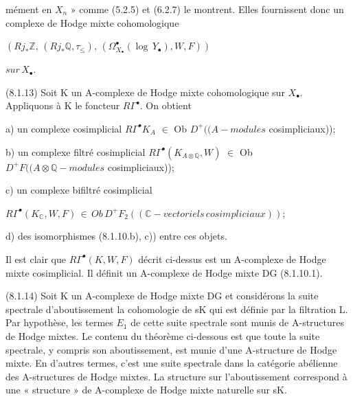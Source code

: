 \documentclass[11pt,twoside]{article}
\newcommand{\DFormula}[1]{%
  \par\smallskip\noindent\hspace*{0pt}\(\displaystyle #1\)\par\smallskip
}
\begin{document}
mément en \(X_{n}\) » comme (5.2.5) et (6.2.7) le montrent. Elles fournissent donc un complexe de Hodge mixte cohomologique\par
\par\medskip
\DFormula{(Rj_{\ast }\mathbb{Z},\,(Rj_{\ast }\mathbb{Q},\tau _{\leq }),\,(\Omega _{X_{\bullet }}^{\bullet }(\operatorname{log}\,Y_{\bullet }),W,F))}
\par\medskip
\DFormula{sur\,X_{\bullet }.}
\par\medskip
(8.1.13) Soit K un A-complexe de Hodge mixte cohomologique sur \(X_{\bullet }\). Appliquons à K le foncteur \(R\Gamma ^{\bullet }\). On obtient\par
\par\medskip
a) un complexe cosimplicial \(R\Gamma ^{\bullet }K_{A}\) \(\in \) Ob \(D^{+}((A-modules\) cosimpliciaux));\par
\par\medskip
b) un complexe filtré cosimplicial \(R\Gamma ^{\bullet }(K_{A\otimes \mathbb{Q}},W)\) \(\in \) Ob \(D^{+}F((A\otimes \mathbb{Q}-modules\) cosimpliciaux));\par
\par\medskip
c) un complexe bifiltré cosimplicial\par
\par\medskip
\DFormula{R\Gamma ^{\bullet }(K_{\mathbb{C}},W,F)\,\in \,Ob\,D^{+}F_{2}((\mathbb{C}-vectoriels\,cosimpliciaux));}
\par\medskip
d) des isomorphismes (8.1.10.b), c)) entre ces objets.\par
\par\medskip
Il est clair que \(R\Gamma ^{\bullet }(K,W,F)\) décrit ci-dessus est un A-complexe de Hodge mixte cosimplicial. Il définit un A-complexe de Hodge mixte DG (8.1.10.1).\par
\par\medskip
(8.1.14) Soit K un A-complexe de Hodge mixte DG et considérons la suite spectrale d’aboutissement la cohomologie de sK qui est définie par la filtration L. Par hypothèse, les termes \(E_{1}\) de cette suite spectrale sont munis de A-structures de Hodge mixtes. Le contenu du théorème ci-dessous est que toute la suite spectrale, y compris son aboutissement, est munie d’une A-structure de Hodge mixte. En d’autres termes, c’est une suite spectrale dans la catégorie abélienne des A-structures de Hodge mixtes. La structure sur l’aboutissement correspond à une « structure » de A-complexe de Hodge mixte naturelle sur sK.\par
\par\medskip
\end{document}
